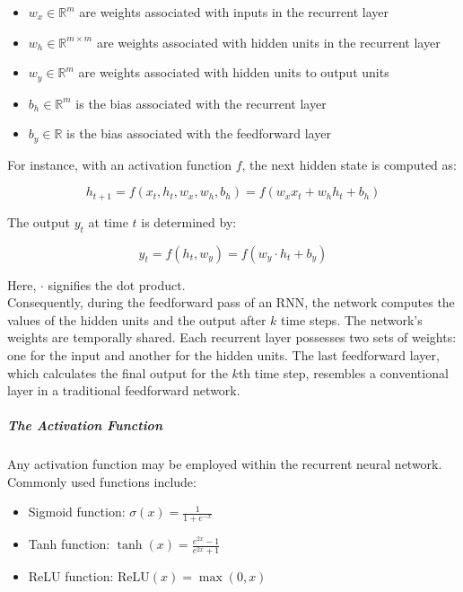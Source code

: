 \begin{itemize}
  \item \( w_x \in \mathbb{R}^m \) are weights associated with inputs in the recurrent layer
  \item \( w_h \in \mathbb{R}^{m \times m} \) are weights associated with hidden units in the recurrent layer
  \item \( w_y \in \mathbb{R}^m \) are weights associated with hidden units to output units
  \item \( b_h \in \mathbb{R}^m \) is the bias associated with the recurrent layer
  \item \( b_y \in \mathbb{R} \) is the bias associated with the feedforward layer

\end{itemize}


For instance, with an activation function \( f \), the next hidden state is computed as:

\[ h_{t+1} = f(x_t, h_t, w_x, w_h, b_h) = f(w_x x_t + w_h h_t + b_h) \]

The output \( y_t \) at time \( t \) is determined by:

\[ y_t = f(h_t, w_y) = f(w_y \cdot h_t + b_y) \]

Here, \( \cdot \) signifies the dot product.\\
Consequently, during the feedforward pass of an RNN, the network computes the values of the hidden units and the output after \( k \) time steps. The network's weights are temporally shared. Each recurrent layer possesses two sets of weights: one for the input and another for the hidden units. The last feedforward layer, which calculates the final output for the \( k \)th time step, resembles a conventional layer in a traditional feedforward network.

\subparagraph{The Activation Function}

Any activation function may be employed within the recurrent neural network. Commonly used functions include:

\begin{itemize}
  \item Sigmoid function: \( \sigma(x) = \frac{1}{1 + e^{-x}} \)
  \item Tanh function: \( \tanh(x) = \frac{e^{2x} - 1}{e^{2x} + 1} \)
  \item ReLU function: \( \text{ReLU}(x) = \max(0, x) \)
\end{itemize}



